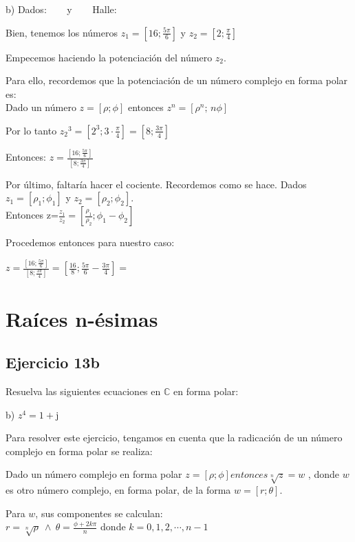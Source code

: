 \documentclass[11pt]{article}
\def\imj{\mathrm{j}}
\begin{document}
	b) Dados: $\;\;$\resizebox{2.25cm}{!}{$z_{1}=16e^{\frac{5\pi}{6}\imj}$} $\;\;$ y $\;\;$ \resizebox{2.25cm}{!}{$z_{2}=2e^{\frac{\pi}{4}\imj}$} $\;\;$ Halle: 
	
	Bien, tenemos los números $z_{1}=\left[ 16;\frac{5\pi}{6} \right]$ y $z_{2}=\left[ 2; \frac{\pi}{4} \right] $
	
	Empecemos haciendo la potenciación del número $z_{2}$.
	
	Para ello, recordemos que la potenciación de un número complejo en forma polar es:\\
	Dado un número $z=\left[ \rho;\phi \right] $ entonces $z^{n}=\left[\rho^{n};\, n\phi \right]$
	
	Por lo tanto ${z_{2}}^3= \left[2^{3}; 3\cdot \frac{\pi}{4}\right]=\left[8; \frac{3\pi}{4}\right]$
	
	Entonces: $z=\frac{\left[16; \frac{5\pi}{6}\right]}{\left[8; \frac{3\pi}{4}\right]}$
	
	Por último, faltaría hacer el cociente. Recordemos como se hace.
	Dados $z_{1}=\left[\rho_{1};\phi_{1}\right]$ y $z_{2}=\left[\rho_{2}; \phi_{2}\right]$.\\
	Entonces z=$\frac{z_{1}}{z_{2}}=\left[\frac{\rho_{1}}{\rho_{2}}; \phi_{1}-\phi_{2}\right]$
	
	Procedemos entonces para nuestro caso:
	
	$z=\frac{\left[16;\frac{5\pi}{6}\right]}{\left[8;\frac{3\pi}{4}\right]}=\left[\frac{16}{8}; \frac{5\pi}{6}-\frac{3\pi}{4}\right] =$ 
	\section{Raíces n-ésimas}
	\subsection{Ejercicio 13b}
	Resuelva las siguientes ecuaciones en $\mathbb{C}$ en forma polar:
	
	b) $z^4=1+\imj$
	
	Para resolver este ejercicio, tengamos en cuenta que la radicación de un número complejo en forma polar se realiza:
	
	Dado un número complejo en forma polar $z=\left[\rho;\phi\right] entonces \sqrt[n]{z}=w$ , donde $w$ es otro número complejo, en forma polar, de la forma $w=\left[r;\theta\right]$.
	
	Para $w$, sus componentes se calculan:\\
	$r=\sqrt[n]{\rho} \: \wedge \: \theta=\frac{\phi +2k\pi}{n}$ donde $k=0,1,2,\cdots,n-1$
	
\end{document}
